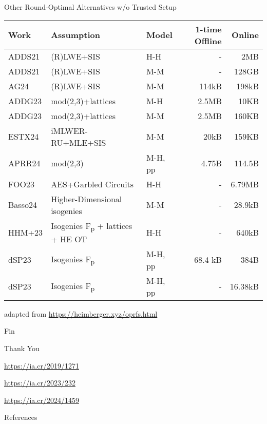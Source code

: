\documentclass[xcolor=table,10pt,aspectratio=169]{beamer}
\begin{document}
\begin{frame}[label={sec:orgdd2d8a1}]{Other Round-Optimal Alternatives w/o Trusted Setup}
\begin{small}

\begin{center}
\begin{tabular}{lllrr}
\toprule
Work & Assumption & Model & 1-time Offline & Online\\
\midrule
ADDS21 & (R)LWE+SIS & H-H & - & 2MB\\
ADDS21 & (R)LWE+SIS & M-M & - & 128GB\\
AG24 & (R)LWE+SIS & M-M & 114kB & 198kB\\
ADDG23 & mod(2,3)+lattices & M-H & 2.5MB & 10KB\\
ADDG23 & mod(2,3)+lattices & M-M & 2.5MB & 160KB\\
ESTX24 & iMLWER-RU+MLE+SIS & M-M & 20kB & 159KB\\
APRR24 & mod(2,3) & M-H, pp & 4.75B & 114.5B\\
FOO23 & AES+Garbled Circuits & H-H & - & 6.79MB\\
Basso24 & Higher-Dimensional isogenies & M-M & - & 28.9kB\\
HHM+23 & Isogenies F\textsubscript{p} + lattices + HE OT & H-H & - & 640kB\\
dSP23 & Isogenies F\textsubscript{p} & M-H, pp & 68.4 kB & 384B\\
dSP23 & Isogenies F\textsubscript{p} & M-H, pp & - & 16.38kB\\
\bottomrule
\end{tabular}

\end{center}

\end{small}

\begin{center}
{\footnotesize adapted from \url{https://heimberger.xyz/oprfs.html} \par}
\end{center}
\end{frame}
\begin{frame}[label={sec:org916c2a4},standout]{Fin}
\begin{center}
{\Huge\alert{Thank You}\par}

\url{https://ia.cr/2019/1271}

\url{https://ia.cr/2023/232}

\url{https://ia.cr/2024/1459}
\end{center}
\end{frame}
\begin{frame}[allowframebreaks]{References}
\renewcommand*{\bibfont}{\scriptsize}
\printbibliography[heading=none]
\end{frame}
\end{document}
